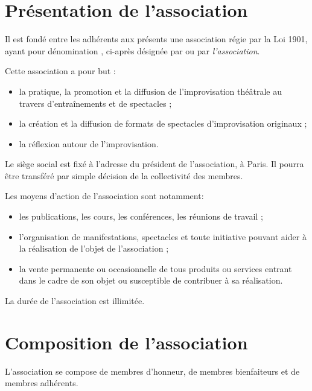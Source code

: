 \setcounter{article}{1}
\section{Présentation de l'association}
\label{sec:constitution}
Il est fondé entre les adhérents aux présents \statuts{} une association
régie par la Loi 1901, ayant pour dénomination \textit{\metae{}}, ci-après désignée par \textit{\meta{}} ou par \textit{l'association}.

\label{sec:but}

Cette association a pour but :
\begin{itemize}
\item la pratique, la promotion et la diffusion de l'improvisation théâtrale au travers d'entraînements et de spectacles ;
\item la création et la diffusion de formats de spectacles d'improvisation originaux ;
\item la réflexion autour de l'improvisation.
\end{itemize}

\label{sec:siege}

Le siège social est fixé à l'adresse du président de l'association, à Paris. Il
pourra être transféré par simple décision de la collectivité des
membres.

\label{sec:moyens}

Les moyens d'action de l'association sont notamment:
\begin{itemize}
\item les publications, les cours, les conférences, les réunions de
travail ;
\item l'organisation de manifestations, spectacles et toute initiative
pouvant aider à la réalisation de l'objet de l'association ;
\item la vente permanente ou occasionnelle de tous produits ou
services entrant dans le cadre de son objet ou susceptible de
contribuer à sa réalisation.
\end{itemize}

\label{sec:duree}
La durée de l'association est illimitée.

\section{Composition de l'association}

\label{sec:composition}
L'association se compose de membres d'honneur, de membres bienfaiteurs
et de membres adhérents.

